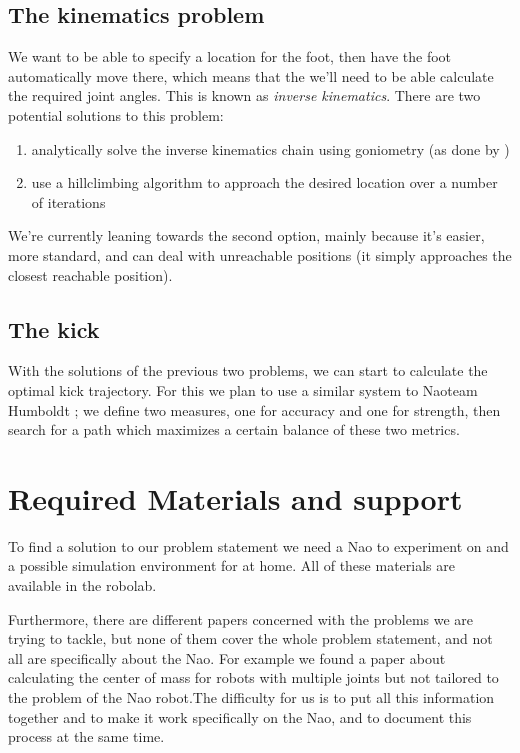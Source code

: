 \documentclass[a4paper]{article}
\begin{document}
\subsection{The kinematics problem}
We want to be able to specify a location for the foot, then have the foot
automatically move there, which means that the we’ll need to be able calculate
the required joint angles. This is known as \emph{inverse kinematics}. There are
two potential solutions to this problem:
\begin{enumerate}
  \item analytically solve the inverse kinematics chain using goniometry (as done by \cite{Graf2009})
\item use a hillclimbing algorithm to approach the desired location over a number of iterations
\end{enumerate}

We’re currently leaning towards the second option, mainly because it’s easier,
more standard, and can deal with unreachable positions (it simply approaches the
closest reachable position).

\subsection{The kick}
With the solutions of the previous two problems, we can start to calculate the
optimal kick trajectory. For this we plan to use a similar system to Naoteam
Humboldt \cite{Muller2011}; we define two measures, one for accuracy and one for
strength, then search for a path which maximizes a certain balance of these two
metrics. 



\section{Required Materials and support} 
To find a solution to our problem statement we need a Nao to experiment on and a
possible simulation environment for at home. All of these materials are
available in the robolab.

Furthermore, there are different papers concerned with the problems we are
trying to tackle, but none of them cover the whole problem statement, and not
all are specifically about the Nao. For example we found a paper about
calculating the center of mass for robots with multiple joints but not tailored
to the problem of the Nao robot.The difficulty for us is to put all this
information together and to make it work specifically on the Nao, and to
document this process at the same time.



\end{document}
